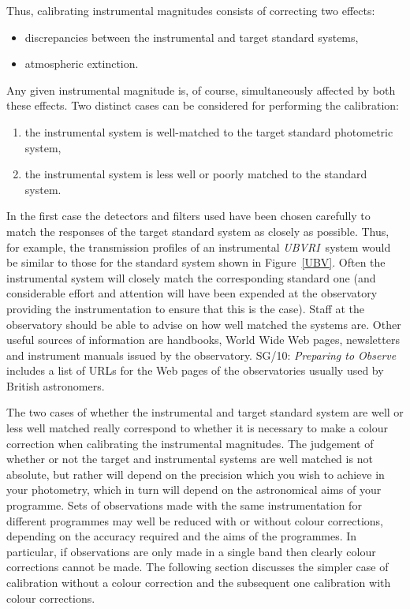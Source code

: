 \documentclass[twoside,11pt]{article}
\newcommand{\xref}[3]{#1}
\begin{document}
Thus, calibrating instrumental magnitudes consists of correcting two
effects:

\begin{itemize}

  \item discrepancies between the instrumental and target standard
   systems,

  \item atmospheric extinction.

\end{itemize}

Any given instrumental magnitude is, of course, simultaneously affected
by both these effects.  Two distinct cases can be considered for
performing the calibration:

\begin{enumerate}

  \item the instrumental system is well-matched to the target standard
   photometric system,

  \item the instrumental system is less well or poorly matched to the
   standard system.

\end{enumerate}

In the first case the detectors and filters used have been chosen
carefully to match the responses of the target standard system as
closely as possible.  Thus, for example, the transmission profiles of
an instrumental {\it UBVRI}\, system would be similar to those for the
standard system shown in Figure~\ref{UBV}.  Often the instrumental
system will closely match the corresponding standard one (and
considerable effort and attention will have been expended at the
observatory providing the instrumentation to ensure that this is the
case).  Staff at the observatory should be able to advise on how
well matched the systems are.  Other useful sources of information
are handbooks, World Wide Web pages, newsletters and instrument manuals
issued by the observatory.  \xref{SG/10: {\it Preparing to
Observe}}{sg10}{}\/\cite{SG10} includes a list of URLs for the Web pages
of the observatories usually used by British astronomers.

The two cases of whether the instrumental and target standard system
are well or less well matched really correspond to whether it is
necessary to make a colour correction when calibrating the instrumental
magnitudes.  The judgement of whether or not the target and instrumental
systems are well matched is not absolute, but rather will depend on the
precision which you wish to achieve in your photometry, which in turn
will depend on the astronomical aims of your programme.  Sets of
observations made with the same instrumentation for different programmes
may well be reduced with or without colour corrections, depending on the
accuracy required and the aims of the programmes.  In particular, if
observations are only made in a single band then clearly colour
corrections cannot be made.  The following section discusses the simpler
case of calibration without a colour correction and the subsequent one
calibration with colour corrections.
\end{document}
